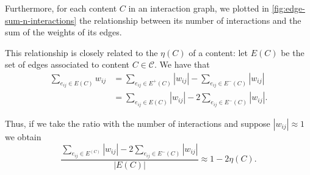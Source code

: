 \bigskip
Furthermore, for each content $C$ in an interaction graph, we plotted in
\autoref{fig:edge-sum-n-interactions} the relationship between its number of
interactions and the sum of the weights of its edges.

This relationship is closely related to the $\eta(C)$ of a content: let $E(C)$
be the set of edges associated to content $C \in \mathcal{C} $. We have that
\begin{align*}
	\sum^{}_{e_{ij} \in E(C)} w_{ij} & = \sum^{}_{e_{ij} \in E^+(C)} |w_{ij}|
	- \sum^{}_{e_{ij} \in E^-(C)} |w_{ij}|                                      \\
	                                 & = \sum^{}_{e_{ij} \in E(C)} |w_{ij}| - 2
	\sum^{}_{e_{ij} \in E^-(C)} |w_{ij}|.
\end{align*}

Thus, if we take the ratio with the number of interactions  and suppose
$|w_{ij}| \approx 1$ we obtain
\begin{equation}
	\label{eq:angular-coeff-eta}
	\frac{\sum^{}_{e_{ij} \in E^(C)} |w_{ij}| - 2 \sum^{}_{e_{ij} \in E^-(C)}
	|w_{ij}|}{|E(C)|} \approx 1 - 2 \eta(C).
\end{equation}

